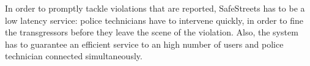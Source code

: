 In order to promptly tackle violations that are reported,
SafeStreets has to be a low latency service: police technicians have
to intervene quickly, in order to fine the transgressors before they
leave the scene of the violation. Also, the system has to guarantee an
efficient service to an high number of users and police technician connected
simultaneously.